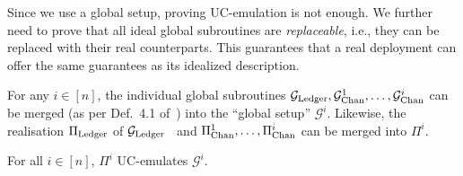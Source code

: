 %

Since we use a global setup, proving UC-emulation is not enough. We further
need to prove that all ideal global subroutines are \emph{replaceable}, i.e.,
they can be replaced with their real counterparts. This guarantees that a real
deployment can offer the same guarantees as its idealized description.

For any $i \in [n]$, the individual global subroutines $\mathcal{G}_{\mathrm{Ledger}}, \mathcal{G}_{\mathrm{Chan}}^{1},
\dots, \mathcal{G}_{\mathrm{Chan}}^{i}$ can be merged (as per Def.~4.1
of~\cite{10.1007/978-3-030-90453-1_22}) into the ``global setup''
$\mathcal{G}^i$. Likewise, the realisation $\Pi_{\mathrm{Ledger}}$ of $\mathcal{G}_{\mathrm{Ledger}}$~\cite{BMTZ17}
and $\Pi_{\mathrm{Chan}}^{1}, \dots, \Pi_{\mathrm{Chan}}^{i}$ can be merged into $\Pi^i$.

\begin{lemma}
\label{lemma:merged-emulate}
For all $i \in [n]$, $\Pi^i$ UC-emulates $\mathcal{G}^i$.
\end{lemma}

